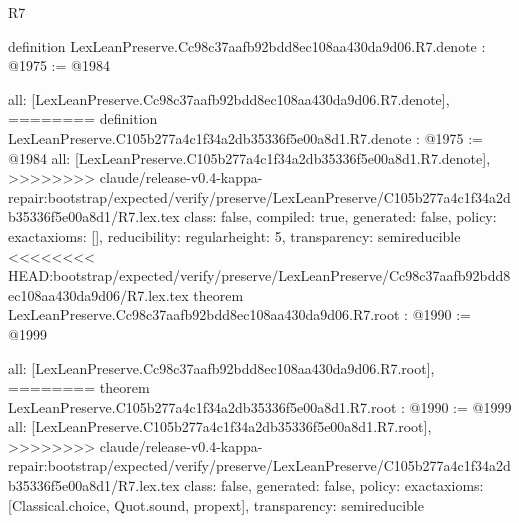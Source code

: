 \begin{lexlean}{R7}
\begin{coremodule}
{{{{{{{{{{{definition LexLeanPreserve.Cc98c37aafb92bdd8ec108aa430da9d06.R7.denote : @1975 := @1984 {
  all: [LexLeanPreserve.Cc98c37aafb92bdd8ec108aa430da9d06.R7.denote],
========
definition LexLeanPreserve.C105b277a4c1f34a2db35336f5e00a8d1.R7.denote : @1975 := @1984 {
  all: [LexLeanPreserve.C105b277a4c1f34a2db35336f5e00a8d1.R7.denote],
>>>>>>>> claude/release-v0.4-kappa-repair:bootstrap/expected/verify/preserve/LexLeanPreserve/C105b277a4c1f34a2db35336f5e00a8d1/R7.lex.tex
  class: false,
  compiled: true,
  generated: false,
  policy: exact{axioms: []},
  reducibility: regular{height: 5},
  transparency: semireducible
}
<<<<<<<< HEAD:bootstrap/expected/verify/preserve/LexLeanPreserve/Cc98c37aafb92bdd8ec108aa430da9d06/R7.lex.tex
theorem LexLeanPreserve.Cc98c37aafb92bdd8ec108aa430da9d06.R7.root : @1990 := @1999 {
  all: [LexLeanPreserve.Cc98c37aafb92bdd8ec108aa430da9d06.R7.root],
========
theorem LexLeanPreserve.C105b277a4c1f34a2db35336f5e00a8d1.R7.root : @1990 := @1999 {
  all: [LexLeanPreserve.C105b277a4c1f34a2db35336f5e00a8d1.R7.root],
>>>>>>>> claude/release-v0.4-kappa-repair:bootstrap/expected/verify/preserve/LexLeanPreserve/C105b277a4c1f34a2db35336f5e00a8d1/R7.lex.tex
  class: false,
  generated: false,
  policy: exact{axioms: [Classical.choice, Quot.sound, propext]},
  transparency: semireducible
}

}}}}}}}}}}}}}
\end{coremodule}
\end{lexlean}
